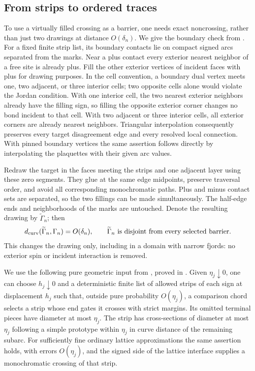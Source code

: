 \subsection{From strips to ordered traces}

To use a virtually filled crossing as a barrier, one needs exact
noncrossing, rather than just two drawings at distance $O(\delta_n)$.
We give the boundary check from
\cite[Section~7, Lemma ``Local drawing beside a signed strip'']{S}.
For a fixed finite strip list, its boundary contacts lie on compact
signed arcs separated from the marks.  Near a plus contact every
exterior nearest neighbor of a free site is already plus.  Fill the
other exterior vertices of incident faces with plus for drawing
purposes.  In the cell convention, a boundary dual vertex meets one,
two adjacent, or three interior cells; two opposite cells alone would
violate the Jordan condition.  With one interior cell, the two
nearest exterior neighbors already have the filling sign, so filling
the opposite exterior corner changes no bond incident to that cell.
With two adjacent or three interior cells, all exterior corners are
already nearest neighbors.  Triangular interpolation consequently
preserves every target disagreement edge and every resolved local
connection.  With pinned boundary vertices the same assertion follows
directly by interpolating the plaquettes with their given arc values.

Redraw the target in the faces meeting the strips and one adjacent
layer using these zero segments.  They glue at the same edge
midpoints, preserve traversal order, and avoid all corresponding
monochromatic paths.  Plus and minus contact sets are separated, so
the two fillings can be made simultaneously.  The half-edge ends
and neighborhoods of the marks are untouched.  Denote the resulting
drawing by $\widetilde\Gamma_n$; then
\begin{equation}
 d_{\rm curv}(\widetilde\Gamma_n,\Gamma_n)=O(\delta_n),
 \qquad \widetilde\Gamma_n\text{ is disjoint from every selected barrier}.
 \label{eq:barrier-redrawing}
\end{equation}
This changes the drawing only, including in a domain with narrow
fjords: no exterior spin or incident interaction is removed.

We use the following pure geometric input from
\cite[Section~9, Lemma ``Finite strips and limiting barriers'']{R},
proved in \cite[Section~7, ``From fixed strip tests to limiting
barriers'']{S}.  Given $\eta_j\downarrow0$, one can choose
$h_j\downarrow0$ and a deterministic finite list of allowed strips
of each sign at displacement $h_j$ such that, outside pure
probability $O(\eta_j)$, a comparison chord selects a strip whose
end gates it crosses with strict margins.  Its omitted terminal
pieces have diameter at most $\eta_j$.  The strip has cross-sections
of diameter at most $\eta_j$ following a simple prototype within
$\eta_j$ in curve distance of the remaining subarc.  For sufficiently
fine ordinary lattice approximations the same assertion holds, with
errors $O(\eta_j)$, and the signed side of the lattice interface
supplies a monochromatic crossing of that strip.

